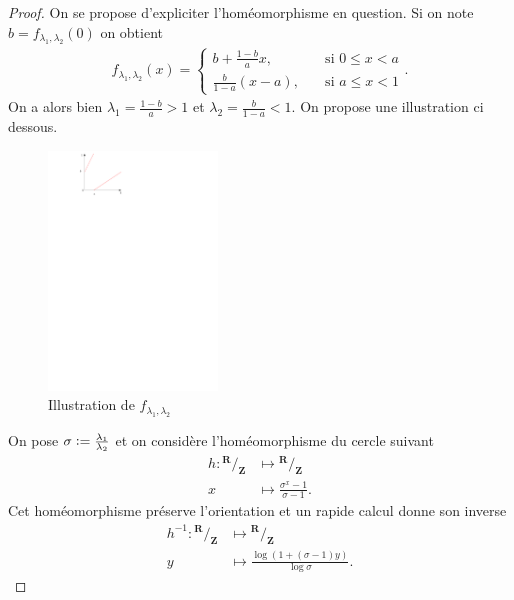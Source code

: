 \documentclass[12pt]{article}
\newcommand{\defeq}{\vcentcolon=}
\newcommand{\R}{\mathbf{R}}
\newcommand{\Z}{\mathbf{Z}}
\newcommand*\quot[2]{{^{\textstyle #1}\big/_{\textstyle #2}}}
\theoremstyle{remark}
\begin{document}
\begin{proof}
        On se propose d'expliciter l'homéomorphisme en question. Si on note $b = f_{\lambda_1, \lambda_2}(0)$ on obtient 
        \begin{align*}
                f_{\lambda_1, \lambda_2}(x) = \begin{cases}
                        b+ \frac{1-b}{a}x, \quad &\text{si } 0 \le x < a \\
                        \frac{b}{1-a}(x-a), \quad &\text{si } a \le x < 1
                \end{cases}
        .\end{align*}
        On a alors bien $\lambda_1 = \frac{1-b}{a} > 1$ et $\lambda_2 = \frac{b}{1-a} < 1$. On propose une illustration ci dessous. 
        \begin{figure}[htpb]
                \centering
                \includegraphics[width=0.4\textwidth]{homeo.pdf}
                \caption{Illustration de $f_{\lambda_1, \lambda_2}$}
                \label{fig:homeo-pdf}
        \end{figure}

        On pose $\sigma \defeq \frac{\lambda_1}{\lambda_2}$ et on considère l'homéomorphisme du cercle suivant
        \begin{align*}
                h : \quot{\R}{\Z} &\longmapsto \quot{\R}{\Z} \\
                x &\longmapsto \frac{\sigma^{x}-1}{\sigma-1} 
        .\end{align*}
        Cet homéomorphisme préserve l'orientation et un rapide calcul donne son inverse
        \begin{align*}
                h^{-1} : \quot{\R}{\Z} &\longmapsto \quot{\R}{\Z} \\
                y &\longmapsto \frac{\log(1+(\sigma -1)y)}{\log\sigma}
        .\end{align*}


\end{proof}
\end{document}
